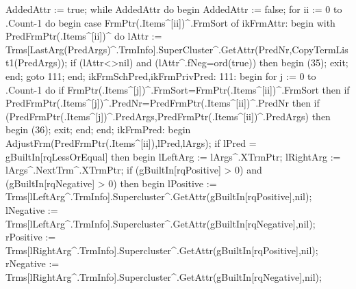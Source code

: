   AddedAttr := true;
   while AddedAttr do
   begin
      AddedAttr := false;
      for ii := 0 to .Count-1 do
      begin
         case FrmPtr(.Items^[ii])^.FrmSort of
            ikFrmAttr:
               begin
                  with PredFrmPtr(.Items^[ii])^ do
                     lAttr := Trms[LastArg(PredArgs)^.TrmInfo].SuperCluster^.GetAttr(PredNr,CopyTermList1(PredArgs));
                  if (lAttr<>nil) and (lAttr^.fNeg=ord(true)) then
                  begin
                     (35);
                     exit;
                  end;
                  goto 111;
               end;
            ikFrmSchPred,ikFrmPrivPred:
               111:  begin
                        for j := 0 to .Count-1 do
                           if FrmPtr(.Items^[j])^.FrmSort=FrmPtr(.Items^[ii])^.FrmSort then
                              if PredFrmPtr(.Items^[j])^.PredNr=PredFrmPtr(.Items^[ii])^.PredNr then
                                 if (PredFrmPtr(.Items^[j])^.PredArgs,PredFrmPtr(.Items^[ii])^.PredArgs) then
                                 begin
                                    (36);
                                    exit;
                                 end;
                     end;
            ikFrmPred:
               begin
                  AdjustFrm(PredFrmPtr(.Items^[ii]),lPred,lArgs);
                  if lPred =  gBuiltIn[rqLessOrEqual] then
                  begin
                     lLeftArg := lArgs^.XTrmPtr;
                     lRightArg := lArgs^.NextTrm^.XTrmPtr;
                     if (gBuiltIn[rqPositive] > 0) and (gBuiltIn[rqNegative] > 0) then
                     begin
                        lPositive := Trms[lLeftArg^.TrmInfo].Supercluster^.GetAttr(gBuiltIn[rqPositive],nil);
                        lNegative := Trms[lLeftArg^.TrmInfo].Supercluster^.GetAttr(gBuiltIn[rqNegative],nil);
                        rPositive := Trms[lRightArg^.TrmInfo].Supercluster^.GetAttr(gBuiltIn[rqPositive],nil);
                        rNegative := Trms[lRightArg^.TrmInfo].Supercluster^.GetAttr(gBuiltIn[rqNegative],nil);
